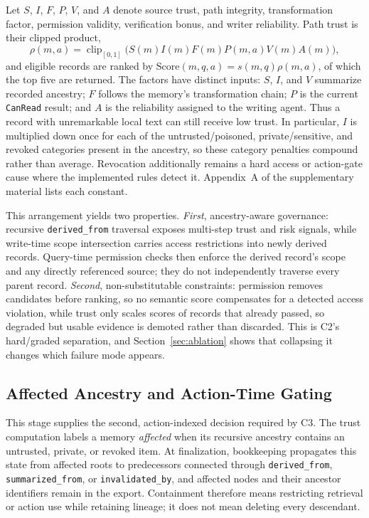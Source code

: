 \documentclass[letterpaper]{article} %
\begin{document}
Let $S$, $I$, $F$, $P$, $V$, and $A$ denote source trust, path integrity, transformation factor, permission validity, verification bonus, and writer reliability. Path trust is their clipped product,
\begin{equation}
\rho(m,a) = \operatorname{clip}_{[0,1]}\!\bigl(S(m)I(m)F(m)P(m,a)V(m)A(m)\bigr),
\label{eq:path-trust}
\end{equation}
and eligible records are ranked by $\mathrm{Score}(m,q,a)=s(m,q)\rho(m,a)$, of which the top five are returned. The factors have distinct inputs: $S$, $I$, and $V$ summarize recorded ancestry; $F$ follows the memory's transformation chain; $P$ is the current \texttt{CanRead} result; and $A$ is the reliability assigned to the writing agent. Thus a record with unremarkable local text can still receive low trust. In particular, $I$ is multiplied down once for each of the untrusted/poisoned, private/sensitive, and revoked categories present in the ancestry, so these category penalties compound rather than average. Revocation additionally remains a hard access or action-gate cause where the implemented rules detect it. Appendix~A of the supplementary material lists each constant.

This arrangement yields two properties. \emph{First}, ancestry-aware governance: recursive \texttt{derived\_from} traversal exposes multi-step trust and risk signals, while write-time scope intersection carries access restrictions into newly derived records. Query-time permission checks then enforce the derived record's scope and any directly referenced source; they do not independently traverse every parent record. \emph{Second}, non-substitutable constraints: permission removes candidates before ranking, so no semantic score compensates for a detected access violation, while trust only scales scores of records that already passed, so degraded but usable evidence is demoted rather than discarded. This is C2's hard/graded separation, and Section~\ref{sec:ablation} shows that collapsing it changes which failure mode appears.

\subsection{Affected Ancestry and Action-Time Gating}
\label{sec:trust-conflict-invalidation}

This stage supplies the second, action-indexed decision required by C3. The trust computation labels a memory \emph{affected} when its recursive ancestry contains an untrusted, private, or revoked item. At finalization, bookkeeping propagates this state from affected roots to predecessors connected through \texttt{derived\_from}, \texttt{summarized\_from}, or \texttt{invalidated\_by}, and affected nodes and their ancestor identifiers remain in the export. Containment therefore means restricting retrieval or action use while retaining lineage; it does not mean deleting every descendant.
\end{document}
